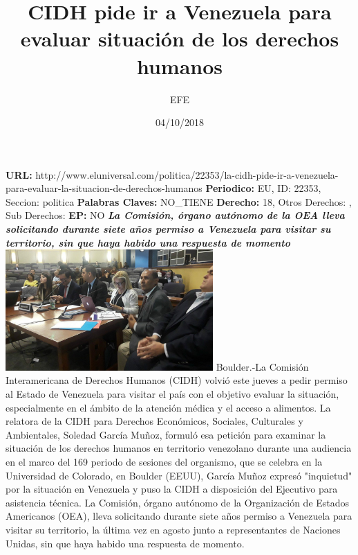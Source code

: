 \documentclass{article}%
\title{\textbf{CIDH pide ir a Venezuela para evaluar situación de los derechos humanos}}%
\author{EFE}%
\date{04/10/2018}%
\begin{document}
%
\normalsize%
\maketitle%
\textbf{URL: }%
http://www.eluniversal.com/politica/22353/la{-}cidh{-}pide{-}ir{-}a{-}venezuela{-}para{-}evaluar{-}la{-}situacion{-}de{-}derechos{-}humanos\newline%
%
\textbf{Periodico: }%
EU, %
ID: %
22353, %
Seccion: %
politica\newline%
%
\textbf{Palabras Claves: }%
NO\_TIENE\newline%
%
\textbf{Derecho: }%
18, %
Otros Derechos: %
, %
Sub Derechos: %
\newline%
%
\textbf{EP: }%
NO\newline%
\newline%
%
\textbf{\textit{La Comisión, órgano autónomo de la OEA lleva solicitando durante siete años permiso a Venezuela para visitar su territorio,  sin que haya habido una respuesta de momento}}%
\newline%
\newline%
%
\includegraphics[width=300px]{130.jpg}%
\newline%
%
Boulder.{-}La Comisión Interamericana de Derechos Humanos (CIDH) volvió este jueves a pedir permiso al Estado de Venezuela para visitar el país con el objetivo evaluar la situación, especialmente en el ámbito de la atención médica y el acceso a alimentos.%
\newline%
%
La relatora de la CIDH para Derechos Económicos, Sociales, Culturales y Ambientales, Soledad García Muñoz, formuló esa petición para examinar la situación de los derechos humanos en territorio venezolano durante una audiencia en el marco del 169 periodo de sesiones del organismo, que se celebra en la Universidad de Colorado, en Boulder (EEUU), García Muñoz expresó "inquietud" por la situación en Venezuela y puso la CIDH a disposición del Ejecutivo para asistencia técnica.%
\newline%
%
La Comisión, órgano autónomo de la Organización de Estados Americanos (OEA), lleva solicitando durante siete años permiso a Venezuela para visitar su territorio, la última vez en agosto junto a representantes de Naciones Unidas, sin que haya habido una respuesta de momento.%
\end{document}
